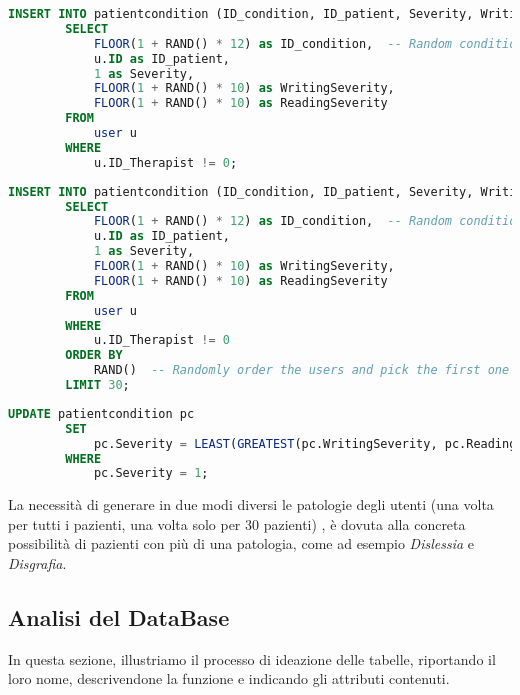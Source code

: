 \documentclass{article}
\begin{document}
    \pagebreak

    \begin{lstlisting}[language=SQL, breaklines, caption=Generazione delle Writing e Reading severity (tutti i pazienti)]
        INSERT INTO patientcondition (ID_condition, ID_patient, Severity, WritingSeverity, ReadingSeverity)
        SELECT
            FLOOR(1 + RAND() * 12) as ID_condition,  -- Random condition ID (1 to 12)
            u.ID as ID_patient,
            1 as Severity,
            FLOOR(1 + RAND() * 10) as WritingSeverity,
            FLOOR(1 + RAND() * 10) as ReadingSeverity
        FROM
            user u
        WHERE
            u.ID_Therapist != 0;
    \end{lstlisting}

    \begin{lstlisting}[language=SQL, breaklines, caption=Generazione delle Writing e Reading severity (solo per 30 pazienti)]
        INSERT INTO patientcondition (ID_condition, ID_patient, Severity, WritingSeverity, ReadingSeverity)
        SELECT
            FLOOR(1 + RAND() * 12) as ID_condition,  -- Random condition ID (1 to 12)
            u.ID as ID_patient,
            1 as Severity,
            FLOOR(1 + RAND() * 10) as WritingSeverity,
            FLOOR(1 + RAND() * 10) as ReadingSeverity
        FROM
            user u
        WHERE
            u.ID_Therapist != 0
        ORDER BY
            RAND()  -- Randomly order the users and pick the first one
        LIMIT 30;
    \end{lstlisting}

    \begin{lstlisting}[language=SQL, breaklines, caption=Generazione della General severity (tutti i pazienti)]
        UPDATE patientcondition pc
        SET
            pc.Severity = LEAST(GREATEST(pc.WritingSeverity, pc.ReadingSeverity) + IF(RAND() < 0.5, -1, 1), 10)
        WHERE
            pc.Severity = 1;
    \end{lstlisting}

    La necessità di generare in due modi diversi le patologie degli utenti (una volta per tutti i pazienti, una volta solo per 30 pazienti) , è dovuta alla concreta possibilità di pazienti con più di una patologia, come ad esempio \textit{Dislessia} e \textit{Disgrafia}.

    \pagebreak

    \subsection{Analisi del DataBase}
    In questa sezione, illustriamo il processo di ideazione delle tabelle, riportando il loro nome, descrivendone la funzione e indicando gli attributi contenuti.
\end{document}
